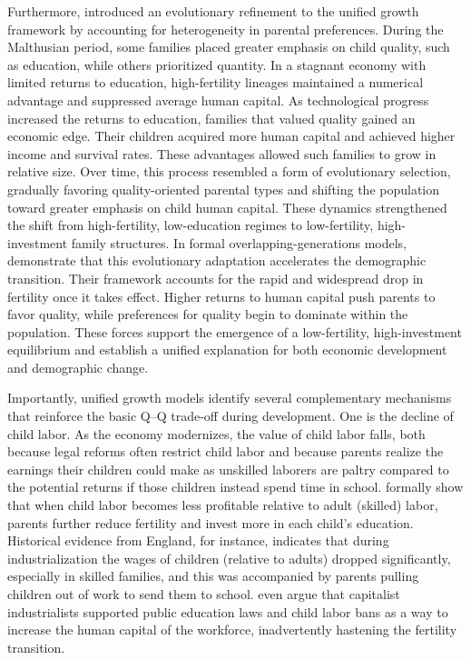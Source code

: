 \documentclass[]{AEA}
\begin{document}
Furthermore, \citet{galor2002natural} introduced an evolutionary
refinement to the unified growth framework by accounting for
heterogeneity in parental preferences. During the Malthusian period,
some families placed greater emphasis on child quality, such as
education, while others prioritized quantity. In a stagnant economy with
limited returns to education, high-fertility lineages maintained a
numerical advantage and suppressed average human capital. As
technological progress increased the returns to education, families that
valued quality gained an economic edge. Their children acquired more
human capital and achieved higher income and survival rates. These
advantages allowed such families to grow in relative size. Over time,
this process resembled a form of evolutionary selection, gradually
favoring quality-oriented parental types and shifting the population
toward greater emphasis on child human capital. These dynamics
strengthened the shift from high-fertility, low-education regimes to
low-fertility, high-investment family structures. In formal
overlapping-generations models, \citet{galor2002natural} demonstrate
that this evolutionary adaptation accelerates the demographic
transition. Their framework accounts for the rapid and widespread drop
in fertility once it takes effect. Higher returns to human capital push
parents to favor quality, while preferences for quality begin to
dominate within the population. These forces support the emergence of a
low-fertility, high-investment equilibrium and establish a unified
explanation for both economic development and demographic change.

Importantly, unified growth models identify several complementary
mechanisms that reinforce the basic Q--Q trade-off during development.
One is the decline of child labor. As the economy modernizes, the value
of child labor falls, both because legal reforms often restrict child
labor and because parents realize the earnings their children could make
as unskilled laborers are paltry compared to the potential returns if
those children instead spend time in school. \citet{hazan2002child}
formally show that when child labor becomes less profitable relative to
adult (skilled) labor, parents further reduce fertility and invest more
in each child's education. Historical evidence from England, for
instance, indicates that during industrialization the wages of children
(relative to adults) dropped significantly, especially in skilled
families, and this was accompanied by parents pulling children out of
work to send them to school. \citet{galor2006human} even argue that
capitalist industrialists supported public education laws and child
labor bans as a way to increase the human capital of the workforce,
inadvertently hastening the fertility transition.
\end{document}
